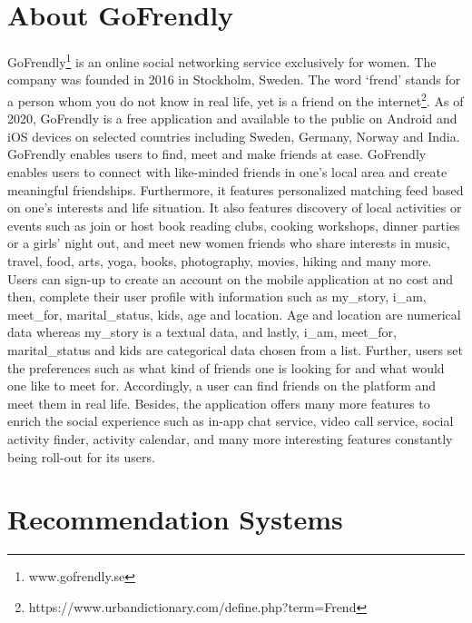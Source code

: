 \documentclass{kththesis}
\begin{document}
\section{About GoFrendly}
GoFrendly\footnote{www.gofrendly.se} is an online social networking service exclusively for women. The company was founded in 2016 in Stockholm, Sweden. The word `frend' stands for a person whom you do not know in real life, yet is a friend on the internet\footnote{https://www.urbandictionary.com/define.php?term=Frend}. As of 2020, GoFrendly is a free application and available to the public on Android and iOS devices on selected countries including Sweden, Germany, Norway and India. GoFrendly enables users to find, meet and make friends at ease. GoFrendly enables users to connect with like-minded friends in one's local area and create meaningful friendships. Furthermore, it features personalized matching feed based on one's interests and life situation. It also features discovery of local activities or events such as join or host book reading clubs, cooking workshops, dinner parties or a girls' night out, and meet new women friends who share interests in music, travel, food, arts, yoga, books, photography, movies, hiking and many more. \\

Users can sign-up to create an account on the mobile application at no cost and then, complete their user profile with information such as my\_story, i\_am, meet\_for, marital\_status, kids, age and location. Age and location are numerical data whereas my\_story is a textual data, and lastly, i\_am, meet\_for, marital\_status and kids are categorical data chosen from a list. Further, users set the preferences such as what kind of friends one is looking for and what would one like to meet for. Accordingly, a user can find friends on the platform and meet them in real life. Besides, the application offers many more features to enrich the social experience such as in-app chat service, video call service, social activity finder, activity calendar, and many more interesting features constantly being roll-out for its users.
\section{Recommendation Systems}
\end{document}
